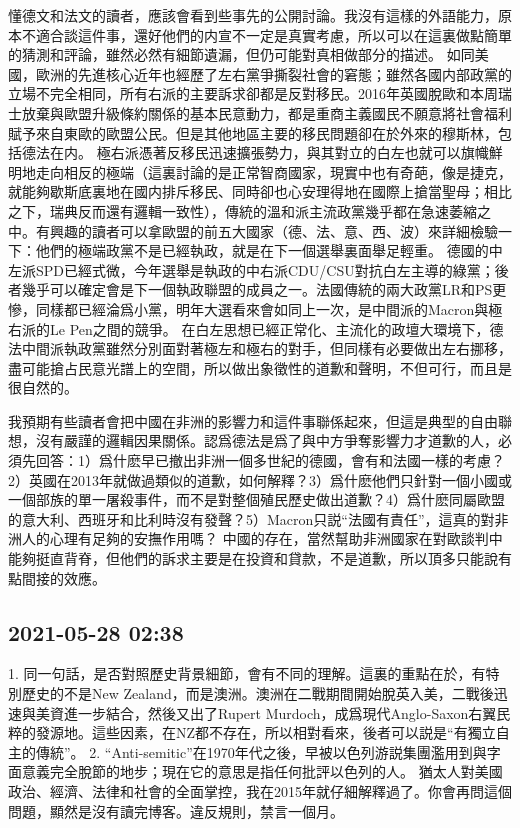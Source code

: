 \documentclass[twocolumn]{ctexart}
\begin{document}
懂德文和法文的讀者，應該會看到些事先的公開討論。我沒有這樣的外語能力，原本不適合談這件事，還好他們的内宣不一定是真實考慮，所以可以在這裏做點簡單的猜測和評論，雖然必然有細節遺漏，但仍可能對真相做部分的描述。
如同美國，歐洲的先進核心近年也經歷了左右黨爭撕裂社會的窘態；雖然各國内部政黨的立場不完全相同，所有右派的主要訴求卻都是反對移民。2016年英國脫歐和本周瑞士放棄與歐盟升級條約關係的基本民意動力，都是重商主義國民不願意將社會福利賦予來自東歐的歐盟公民。但是其他地區主要的移民問題卻在於外來的穆斯林，包括德法在内。
極右派憑著反移民迅速擴張勢力，與其對立的白左也就可以旗幟鮮明地走向相反的極端（這裏討論的是正常智商國家，現實中也有奇葩，像是捷克，就能夠歇斯底裏地在國内排斥移民、同時卻也心安理得地在國際上搶當聖母；相比之下，瑞典反而還有邏輯一致性），傳統的溫和派主流政黨幾乎都在急速萎縮之中。有興趣的讀者可以拿歐盟的前五大國家（德、法、意、西、波）來詳細檢驗一下：他們的極端政黨不是已經執政，就是在下一個選舉裏面舉足輕重。
德國的中左派SPD已經式微，今年選舉是執政的中右派CDU/CSU對抗白左主導的綠黨；後者幾乎可以確定會是下一個執政聯盟的成員之一。法國傳統的兩大政黨LR和PS更慘，同樣都已經淪爲小黨，明年大選看來會如同上一次，是中間派的Macron與極右派的Le Pen之間的競爭。
在白左思想已經正常化、主流化的政壇大環境下，德法中間派執政黨雖然分別面對著極左和極右的對手，但同樣有必要做出左右挪移，盡可能搶占民意光譜上的空間，所以做出象徵性的道歉和聲明，不但可行，而且是很自然的。

我預期有些讀者會把中國在非洲的影響力和這件事聯係起來，但這是典型的自由聯想，沒有嚴謹的邏輯因果關係。認爲德法是爲了與中方爭奪影響力才道歉的人，必須先回答：1）爲什麽早已撤出非洲一個多世紀的德國，會有和法國一樣的考慮？2）英國在2013年就做過類似的道歉，如何解釋？3）爲什麽他們只針對一個小國或一個部族的單一屠殺事件，而不是對整個殖民歷史做出道歉？4）爲什麽同屬歐盟的意大利、西班牙和比利時沒有發聲？5）Macron只説“法國有責任”，這真的對非洲人的心理有足夠的安撫作用嗎？
中國的存在，當然幫助非洲國家在對歐談判中能夠挺直背脊，但他們的訴求主要是在投資和貸款，不是道歉，所以頂多只能說有點間接的效應。
\subsection*{2021-05-28 02:38}

1. 同一句話，是否對照歷史背景細節，會有不同的理解。這裏的重點在於，有特別歷史的不是New Zealand，而是澳洲。澳洲在二戰期間開始脫英入美，二戰後迅速與美資進一步結合，然後又出了Rupert Murdoch，成爲現代Anglo-Saxon右翼民粹的發源地。這些因素，在NZ都不存在，所以相對看來，後者可以説是“有獨立自主的傳統”。
2. “Anti-semitic”在1970年代之後，早被以色列游説集團濫用到與字面意義完全脫節的地步；現在它的意思是指任何批評以色列的人。
猶太人對美國政治、經濟、法律和社會的全面掌控，我在2015年就仔細解釋過了。你會再問這個問題，顯然是沒有讀完博客。違反規則，禁言一個月。
\end{document}
